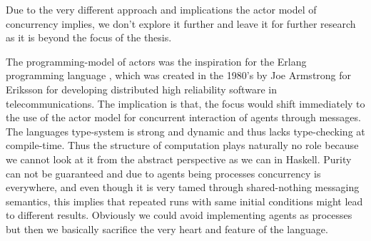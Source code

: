 Due to the very different approach and implications the actor model of concurrency implies, we don't explore it further and leave it for further research as it is beyond the focus of the thesis.

The programming-model of actors \cite{agha_actors:_1986} was the inspiration for the Erlang programming language \cite{armstrong_erlang_2010}, which was created in the 1980's by Joe Armstrong for Eriksson for developing distributed high reliability software in telecommunications. The implication is that, the focus would shift immediately to the use of the actor model for concurrent interaction of agents through messages. The languages type-system is strong and dynamic and thus lacks type-checking at compile-time. Thus the structure of computation plays naturally no role because we cannot look at it from the abstract perspective as we can in Haskell. Purity can not be guaranteed and due to agents being processes concurrency is everywhere, and even though it is very tamed through shared-nothing messaging semantics, this implies that repeated runs with same initial conditions might lead to different results. Obviously we could avoid implementing agents as processes but then we basically sacrifice the very heart and feature of the language.